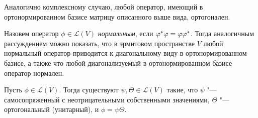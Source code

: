 \begin{note}
	Аналогично комплексному случаю, любой оператор, имеющий в ортонормированном базисе матрицу описанного выше вида, ортогонален.
\end{note}

\begin{note}
	Назовем оператор $\phi \in \mathcal{L}(V)$ \textit{нормальным}, если $\phi^*\phi \hm{=} \phi\phi^*$. Тогда аналогичным рассуждением можно показать, что в эрмитовом пространстве $V$ любой нормальный оператор приводится к диагональному виду в ортонормированном базисе, а также что любой диагонализуемый в ортонормированном базисе оператор нормален.
\end{note}

\begin{theorem}
	Пусть $\phi \in \mathcal{L}(V)$. Тогда существуют $\psi, \Theta \in \mathcal{L}(V)$ такие, что $\psi$ "--- самосопряженный с неотрицательными собственными значениями, $\Theta$ "--- ортогональный (унитарный), и $\phi = \psi\Theta$.
\end{theorem}

